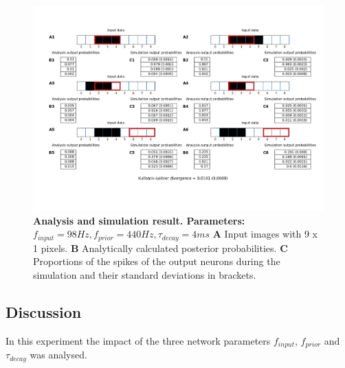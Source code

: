 \begin{figure}
  \includegraphics[width=\linewidth]{figures/1D/1D_98_440_4.png}
  \caption{\textbf{Analysis and simulation result. Parameters: } $f_{input} = 98 Hz, f_{prior} = 440 Hz, \tau_{decay} = 4 ms$ \textbf{A} Input images with 9 x 1 pixels. \textbf{B} Analytically calculated posterior probabilities. \textbf{C} Proportions of the spikes of the output neurons during the simulation and their standard deviations in brackets.}
  \label{fig:1D_98_440_4}
\end{figure}

\subsection{Discussion}

In this experiment the impact of the three network parameters $f_{input}$, $f_{prior}$ and $\tau_{decay}$ was analysed.

